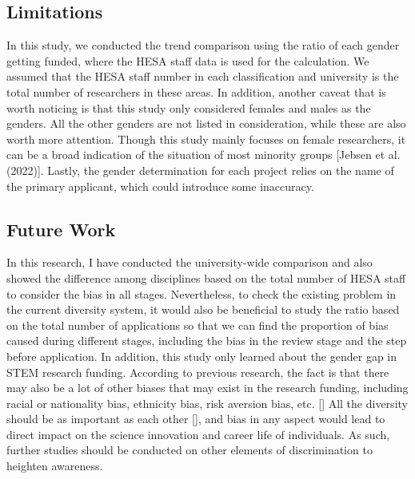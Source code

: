 \subsection{Limitations}
In this study, we conducted the trend comparison using the ratio of each gender getting funded, where the HESA staff data is used for the calculation. We assumed that the HESA staff number in each classification and university is the total number of researchers in these areas. In addition, another caveat that is worth noticing is that this study only considered females and males as the genders. All the other genders are not listed in consideration, while these are also worth more attention. Though this study mainly focuses on female researchers, it can be a broad indication of the situation of most minority groups [Jebsen et al. (2022)]. Lastly, the gender determination for each project relies on the name of the primary applicant, which could introduce some inaccuracy.\\
\subsection{Future Work}

In this research, I have conducted the university-wide comparison and also showed the difference among disciplines based on the total number of HESA staff to consider the bias in all stages. Nevertheless, to check the existing problem in the current diversity system, it would also be beneficial to study the ratio based on the total number of applications so that we can find the proportion of bias caused during different stages, including the bias in the review stage and the step before application. In addition, this study only learned about the gender gap in STEM research funding. According to previous research, the fact is that there may also be a lot of other biases that may exist in the research funding, including racial or nationality bias, ethnicity bias, risk aversion bias, etc. [\cite{wojick2015government}] All the diversity should be as important as each other [\cite{LSE2018}], and bias in any aspect would lead to direct impact on the science innovation and career life of individuals. As such, further studies should be conducted on other elements of discrimination to heighten awareness. 

\pagebreak